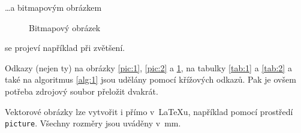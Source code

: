 \documentclass[11pt,a4paper]{article}
\begin{document}
\dots a bitmapovým obrázkem
\begin{figure}[h]	%
	\centering %
	\caption{Bitmapový obrázek}
	\label{pic:3}
\end{figure}

se projeví například při zvětšení. 

Odkazy (nejen ty) na obrázky \ref{pic:1}, \ref{pic:2} a \ref{pic:3}, na tabulky
\ref{tab:1} a \ref{tab:2} a také na algoritmus \ref{alg:1} jsou udělány pomocí
křížových odkazů. Pak je ovšem potřeba zdrojový soubor přeložit dvakrát.

Vektorové obrázky lze vytvořit i přímo v~\LaTeX u, například pomocí prostředí
\verb|picture|. Všechny rozměry jsou uváděny v~mm.
\end{document}
